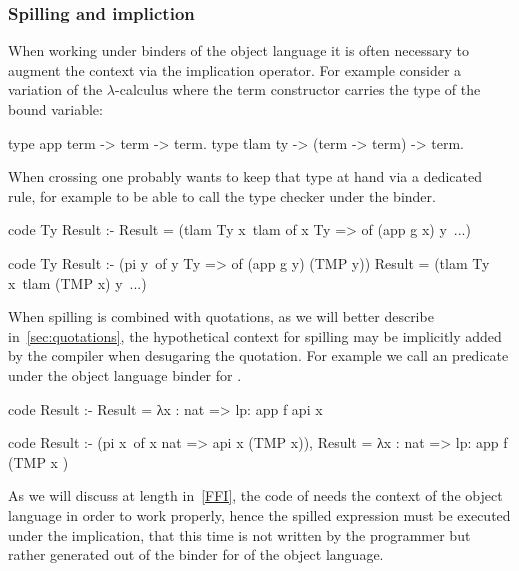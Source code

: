 \documentclass{these-ISSS}
\newenvironment{elpicode}
  {\VerbatimEnvironment\begin{elpibox}\begin{xelpicode}}{\end{xelpicode}
\end{elpibox}}
\begin{document}
\subsubsection{Spilling and impliction}

When working under binders of the object language it is often
necessary to augment the context via
the implication operator. For example consider a variation of
the $\lambda$-calculus where the 
term constructor carries the type of the bound variable:

\begin{elpicode}
type app        term -> term -> term.
type tlam ty -> (term -> term) -> term.
\end{elpicode}

When crossing  one probably wants to keep that type at hand via
a dedicated rule, for example to be able to call the type
checker under the binder.

\begin{elpicode}
  code Ty Result :- 
    Result = (tlam Ty x\ tlam {of x Ty => of (app g x)} y\ ...)

  code Ty Result :-
    (pi y\ of y Ty => of (app g y) (TMP y))
    Result = (tlam Ty x\ tlam (TMP x) y\ ...)
\end{elpicode}

\noindent
When spilling is combined with quotations, as we
will better describe in~\cref{sec:quotations},
the hypothetical context for spilling may be implicitly added by the
compiler when desugaring the quotation.
For example
we call an predicate  under the object language binder
for .

\begin{elpicode}
  code Result :-
    Result = {{ λx : nat => lp:{{ app f {api x}  }}  }}

  code Result :-
    (pi x\ of x {{ nat }} => api x (TMP x)),
    Result = {{ λx : nat => lp:{{ app f (TMP {{ x }})  }}  }}
\end{elpicode}

\noindent
As we will discuss at length in~\cref{FFI}, the code of  needs the
context of the object language in order to work properly, hence the
spilled expression must be executed under the implication, that this time
is not written by the programmer but rather generated out of the binder
for  of the object language.
\end{document}
